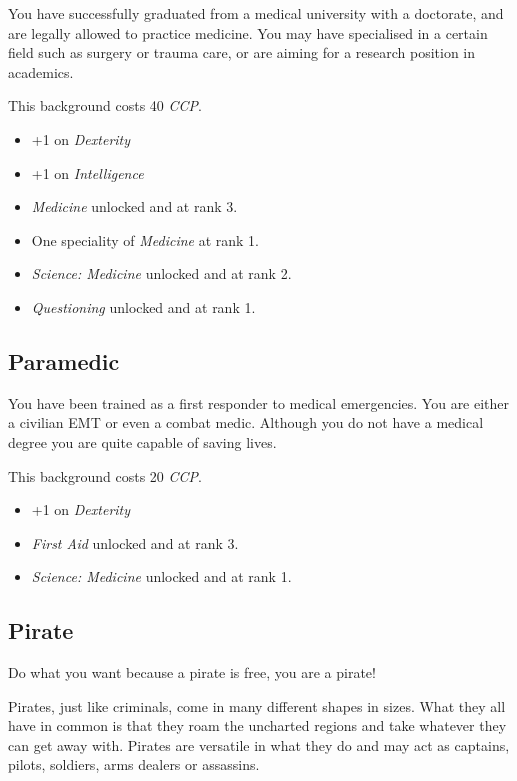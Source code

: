 You have successfully graduated from a medical university with a doctorate,
and are legally allowed to practice medicine. You may have specialised in
a certain field such as surgery or trauma care, or are aiming for a research
position in academics.

This background costs 40 \emph{CCP}.

\begin{itemize}
\item +1 on \emph{Dexterity}
\item +1 on \emph{Intelligence}
\item \emph{Medicine} unlocked and at rank 3.
\item One speciality of \emph{Medicine} at rank 1.
\item \emph{Science: Medicine} unlocked and at rank 2.
\item \emph{Questioning} unlocked and at rank 1.
\end{itemize}

\subsection{Paramedic}

You have been trained as a first responder to medical emergencies. You are
either a civilian EMT or even a combat medic. Although you do not have a medical
degree you are quite capable of saving lives.

This background costs 20 \emph{CCP}.

\begin{itemize}
\item +1 on \emph{Dexterity}
\item \emph{First Aid} unlocked and at rank 3.
\item \emph{Science: Medicine} unlocked and at rank 1.
\end{itemize}

\subsection{Pirate}

Do what you want because a pirate is free, you are a pirate!

Pirates, just like criminals, come in many different shapes in sizes. What they
all have in common is that they roam the uncharted regions and take whatever
they can get away with. Pirates are versatile in what they do and may act as
captains, pilots, soldiers, arms dealers or assassins.

